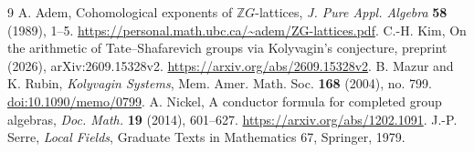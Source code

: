 \documentclass[11pt]{article}
\theoremstyle{definition}\newtheorem{definition}[theorem]{Definition}\newtheorem{example}[theorem]{Example}
\theoremstyle{remark}\newtheorem{remark}[theorem]{Remark}
\begin{document}
\begin{thebibliography}{9}\small
{} A. Adem, Cohomological exponents of $\mathbb ZG$-lattices, \emph{J. Pure Appl. Algebra} \textbf{58} (1989), 1--5. \url{https://personal.math.ubc.ca/~adem/ZG-lattices.pdf}.
 C.-H. Kim, On the arithmetic of Tate--Shafarevich groups via Kolyvagin's conjecture, preprint (2026), arXiv:2609.15328v2. \url{https://arxiv.org/abs/2609.15328v2}.
 B. Mazur and K. Rubin, \emph{Kolyvagin Systems}, Mem. Amer. Math. Soc. \textbf{168} (2004), no. 799. \href{https://doi.org/10.1090/memo/0799}{doi:10.1090/memo/0799}.
 A. Nickel, A conductor formula for completed group algebras, \emph{Doc. Math.} \textbf{19} (2014), 601--627. \url{https://arxiv.org/abs/1202.1091}.
 J.-P. Serre, \emph{Local Fields}, Graduate Texts in Mathematics 67, Springer, 1979.
\end{thebibliography}
\end{document}
